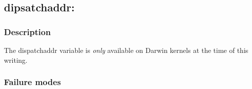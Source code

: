 \clearpage
{}
{}
\label{vars:dispatchaddr}
\subsection*{dipsatchaddr:}

\subsubsection*{Description}

The dispatchaddr variable is \emph{only} available on Darwin kernels
at the time of this writing.

\subsubsection*{Failure modes}

